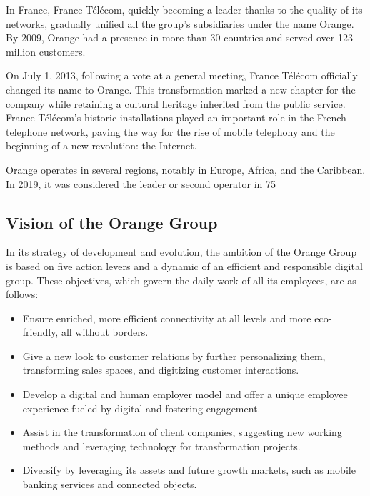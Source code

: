 In France, France Télécom, quickly becoming a leader thanks to the quality of its networks, gradually unified all the group's subsidiaries under the name Orange. By 2009, Orange had a presence in more than 30 countries and served over 123 million customers.

On July 1, 2013, following a vote at a general meeting, France Télécom officially changed its name to Orange. This transformation marked a new chapter for the company while retaining a cultural heritage inherited from the public service. France Télécom's historic installations played an important role in the French telephone network, paving the way for the rise of mobile telephony and the beginning of a new revolution: the Internet.

Orange operates in several regions, notably in Europe, Africa, and the Caribbean. In 2019, it was considered the leader or second operator in 75%

\newpage

\subsection{Vision of the Orange Group}

In its strategy of development and evolution, the ambition of the Orange Group is based on five action levers and a dynamic of an efficient and responsible digital group. These objectives, which govern the daily work of all its employees, are as follows:
\begin{itemize}
    \item Ensure enriched, more efficient connectivity at all levels and more eco-friendly, all without borders.
    \item Give a new look to customer relations by further personalizing them, transforming sales spaces, and digitizing customer interactions.
    \item Develop a digital and human employer model and offer a unique employee experience fueled by digital and fostering engagement.
    \item Assist in the transformation of client companies, suggesting new working methods and leveraging technology for transformation projects.
    \item Diversify by leveraging its assets and future growth markets, such as mobile banking services and connected objects.
\end{itemize}

